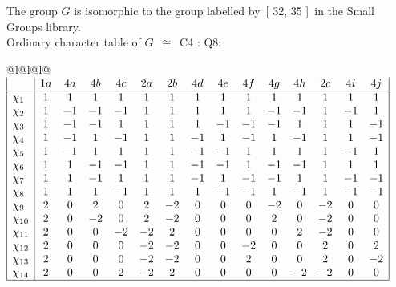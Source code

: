 \documentclass[varwidth=\maxdimen,border=10]{standalone}
\begin{document}
The group $G$ is isomorphic to the group labelled by\ [ 32, 35 ]\ in the Small Groups library.\\
Ordinary character table of $G$\ $\cong$\ C4 : Q8:\\
\begin{center}
\begin{tabular}{@{}l@{}l@{}l@{}}
\hline
\(\begin{array}{|l|cccccccccccccc|}
  & 1a & 4a & 4b & 4c & 2a & 2b & 4d & 4e & 4f & 4g & 4h & 2c & 4i & 4j\\ \hline
\chi_{1} & 1 & 1 & 1 & 1 & 1 & 1 & 1 & 1 & 1 & 1 & 1 & 1 & 1 & 1\\
\chi_{2} & 1 & -1 & -1 & -1 & 1 & 1 & 1 & 1 & 1 & -1 & -1 & 1 & -1 & 1\\
\chi_{3} & 1 & -1 & -1 & 1 & 1 & 1 & 1 & -1 & -1 & -1 & 1 & 1 & 1 & -1\\
\chi_{4} & 1 & -1 & 1 & -1 & 1 & 1 & -1 & 1 & -1 & 1 & -1 & 1 & 1 & -1\\
\chi_{5} & 1 & -1 & 1 & 1 & 1 & 1 & -1 & -1 & 1 & 1 & 1 & 1 & -1 & 1\\
\chi_{6} & 1 & 1 & -1 & -1 & 1 & 1 & -1 & -1 & 1 & -1 & -1 & 1 & 1 & 1\\
\chi_{7} & 1 & 1 & -1 & 1 & 1 & 1 & -1 & 1 & -1 & -1 & 1 & 1 & -1 & -1\\
\chi_{8} & 1 & 1 & 1 & -1 & 1 & 1 & 1 & -1 & -1 & 1 & -1 & 1 & -1 & -1\\
\chi_{9} & 2 & 0 & 2 & 0 & 2 & -2 & 0 & 0 & 0 & -2 & 0 & -2 & 0 & 0\\
\chi_{10} & 2 & 0 & -2 & 0 & 2 & -2 & 0 & 0 & 0 & 2 & 0 & -2 & 0 & 0\\
\chi_{11} & 2 & 0 & 0 & -2 & -2 & 2 & 0 & 0 & 0 & 0 & 2 & -2 & 0 & 0\\
\chi_{12} & 2 & 0 & 0 & 0 & -2 & -2 & 0 & 0 & -2 & 0 & 0 & 2 & 0 & 2\\
\chi_{13} & 2 & 0 & 0 & 0 & -2 & -2 & 0 & 0 & 2 & 0 & 0 & 2 & 0 & -2\\
\chi_{14} & 2 & 0 & 0 & 2 & -2 & 2 & 0 & 0 & 0 & 0 & -2 & -2 & 0 & 0\\
\hline
\end{array}\)\\
\end{tabular}
\end{center}
\end{document}
